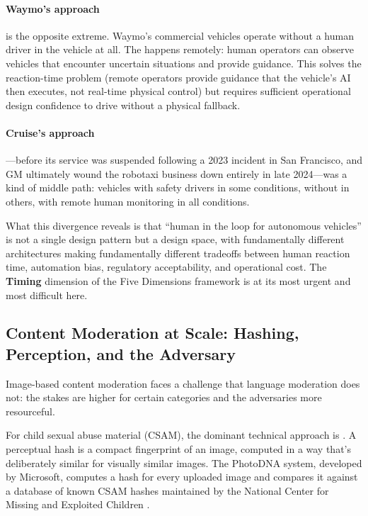 \paragraph{Waymo's approach} is the opposite extreme. Waymo's commercial vehicles operate without a human driver in the vehicle at all. The \hitl happens remotely: human operators can observe vehicles that encounter uncertain situations and provide guidance. This solves the reaction-time problem (remote operators provide guidance that the vehicle's AI then executes, not real-time physical control) but requires sufficient operational design confidence to drive without a physical fallback.

\paragraph{Cruise's approach}---before its service was suspended following a 2023 incident in San Francisco, and GM ultimately wound the robotaxi business down entirely in late 2024---was a kind of middle path: vehicles with safety drivers in some conditions, without in others, with remote human monitoring in all conditions.

What this divergence reveals is that ``human in the loop for autonomous vehicles'' is not a single design pattern but a design space, with fundamentally different architectures making fundamentally different tradeoffs between human reaction time, automation bias, regulatory acceptability, and operational cost. The \textbf{Timing} dimension of the Five Dimensions framework is at its most urgent and most difficult here.

\subsection{Content Moderation at Scale: Hashing, Perception, and the Adversary}

Image-based content moderation faces a challenge that language moderation does not: the stakes are higher for certain categories and the adversaries more resourceful.

For child sexual abuse material (CSAM), the dominant technical approach is . A perceptual hash is a compact fingerprint of an image, computed in a way that's deliberately similar for visually similar images. The PhotoDNA system, developed by Microsoft, computes a hash for every uploaded image and compares it against a database of known CSAM hashes maintained by the National Center for Missing and Exploited Children \autocite{farid2021perceptual}.

